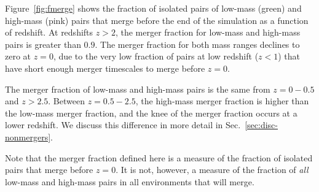 \documentclass[twocolumn,linenumbers]{aastex631}
\begin{document}
Figure~\ref{fig:fmerge} shows the fraction of isolated pairs of low-mass (green) and high-mass (pink) pairs that merge before the end of the simulation as a function of redshift. 
At redshifts $z>2$, the merger fraction for low-mass and high-mass pairs is greater than $0.9$.
The merger fraction for both mass ranges declines to zero at $z=0$, due to the very low fraction of pairs at low redshift ($z<1$) that have short enough merger timescales to merge before $z=0$.

The merger fraction of low-mass and high-mass pairs is the same from $z=0-0.5$ and $z>2.5$. 
Between $z=0.5-2.5$, the high-mass merger fraction is higher than the low-mass merger fraction, and the knee of the merger fraction occurs at a lower redshift. 
We discuss this difference in more detail in Sec.~\ref{sec:disc-nonmergers}.

Note that the merger fraction defined here is a measure of the fraction of isolated pairs that merge before $z=0$. It is not, however, a measure of the fraction of \textit{all} low-mass and high-mass pairs in all environments that will merge. 




\end{document}
